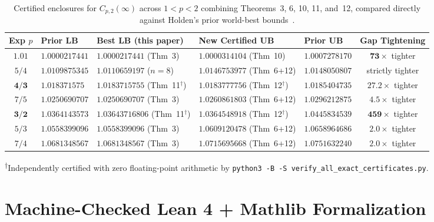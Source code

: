 \documentclass[10pt,letterpaper]{article}
\begin{document}
\begin{table}[htbp]
\centering
\caption{\small Certified enclosures for $C_{p,2}(\infty)$ across $1 < p < 2$ combining Theorems~3, 6, 10, 11, and~12, compared directly against Holden's prior world-best bounds~\cite{Holden2026b}.}
\vspace{3pt}
\footnotesize
\setlength{\tabcolsep}{4.0pt}
\begin{tabular}{@{}c l l l l c@{}}
\toprule
\textbf{Exp $p$} & \textbf{Prior LB} & \textbf{Best LB (this paper)} & \textbf{New Certified UB} & \textbf{Prior UB~\cite{Holden2026b}} & \textbf{Gap Tightening} \\
\midrule
$1.01$ & $1.0000217441$ & $1.0000217441$ (Thm~3) & $\mathbf{1.0000314104}$ (Thm~10) & $1.0007278170$ & $\mathbf{73\times}$ tighter \\
$5/4$  & $1.0109875345$ & $1.0110659197$ ($n=8$) & $\mathbf{1.0146753977}$ (Thm~6+12) & $1.0148050807$ & strictly tighter \\
$\mathbf{4/3}$ & $1.018371575$ & $\mathbf{1.0183715755}$ (Thm~11$^\dagger$) & $\mathbf{1.0183777756}$ (Thm~12$^\dagger$) & $1.0185404735$ & $\mathbf{27.2\times}$ tighter \\
$7/5$  & $1.0250690707$ & $1.0250690707$ (Thm~3) & $\mathbf{1.0260861803}$ (Thm~6+12) & $1.0296212875$ & $\mathbf{4.5\times}$ tighter \\
$\mathbf{3/2}$ & $1.0364143573$ & $\mathbf{1.03643716806}$ (Thm~11$^\dagger$) & $\mathbf{1.0364548918}$ (Thm~12$^\dagger$) & $1.0445834539$ & $\mathbf{459\times}$ tighter \\
$5/3$  & $1.0558399096$ & $1.0558399096$ (Thm~3) & $\mathbf{1.0609120478}$ (Thm~6+12) & $1.0658964686$ & $\mathbf{2.0\times}$ tighter \\
$7/4$  & $1.0681348567$ & $1.0681348567$ (Thm~3) & $\mathbf{1.0715695668}$ (Thm~6+12) & $1.0751632240$ & $\mathbf{2.0\times}$ tighter \\
\bottomrule
\end{tabular}
\vspace{4pt}
\par\parbox{0.96\textwidth}{\footnotesize\textsuperscript{$\dagger$}Independently certified with zero floating-point arithmetic by \texttt{python3 -B -S verify\_all\_exact\_certificates.py}.}
\label{tab:enclosures}
\end{table}

\section{Machine-Checked Lean 4 + Mathlib Formalization}
\end{document}
